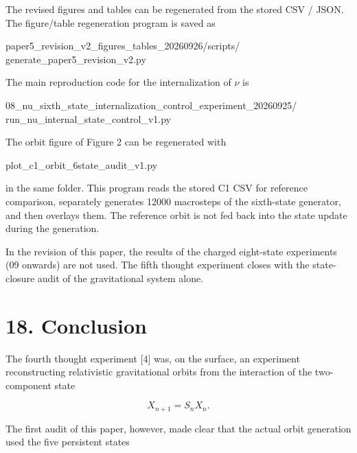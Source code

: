 \documentclass[
  a4paper,
]{article}
\newenvironment{Shaded}{}{}
\newcommand{\NormalTok}[1]{#1}
\begin{document}
The revised figures and tables can be regenerated from the stored CSV /
JSON. The figure/table regeneration program is saved as

\begin{Shaded}
\begin{Highlighting}[]
\NormalTok{paper5\_revision\_v2\_figures\_tables\_20260926/scripts/}
\NormalTok{generate\_paper5\_revision\_v2.py}
\end{Highlighting}
\end{Shaded}

The main reproduction code for the internalization of \(\nu\) is

\begin{Shaded}
\begin{Highlighting}[]
\NormalTok{08\_nu\_sixth\_state\_internalization\_control\_experiment\_20260925/}
\NormalTok{run\_nu\_internal\_state\_control\_v1.py}
\end{Highlighting}
\end{Shaded}

The orbit figure of Figure 2 can be regenerated with

\begin{Shaded}
\begin{Highlighting}[]
\NormalTok{plot\_c1\_orbit\_6state\_audit\_v1.py}
\end{Highlighting}
\end{Shaded}

in the same folder. This program reads the stored C1 CSV for reference
comparison, separately generates 12000 macrosteps of the sixth-state
generator, and then overlays them. The reference orbit is not fed back
into the state update during the generation.

In the revision of this paper, the results of the charged eight-state
experiments (09 onwards) are not used. The fifth thought experiment
closes with the state-closure audit of the gravitational system alone.

\section{18. Conclusion}\label{conclusion}

The fourth thought experiment {[}4{]} was, on the surface, an experiment
reconstructing relativistic gravitational orbits from the interaction of
the two-component state

\[
X_{n+1}=S_nX_n.
\]

The first audit of this paper, however, made clear that the actual orbit
generation used the five persistent states
\end{document}
